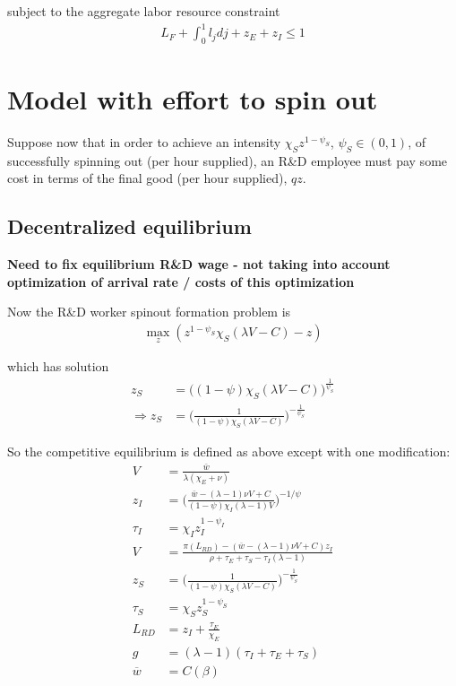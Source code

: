 \documentclass[12pt,english]{article}
\theoremstyle{remark}
\begin{document}
subject to the aggregate labor resource constraint
\begin{align*}
L_F + \int_0^1 l_j dj + z_E + z_I \le 1
\end{align*}

\section{Model with effort to spin out}

Suppose now that in order to achieve an intensity $\chi_S z^{1-\psi_S}$, $\psi_S \in (0,1)$, of successfully spinning out (per hour supplied), an R\&D employee must pay some cost in terms of the final good (per hour supplied), $qz$. 

\subsection{Decentralized equilibrium}

\textbf{Need to fix equilibrium R\&D wage - not taking into account optimization of arrival rate / costs of this optimization}

Now the R\&D worker spinout formation problem is 
\begin{align*}
	\max_{z} (z^{1-\psi_S} \chi_S (\lambda V - C) - z)
\end{align*} 

which has solution
\begin{align*}
	z_S &= \Big( (1-\psi) \chi_S (\lambda V - C)  \Big)^{\frac{1}{\psi_S}} \\
	\Rightarrow z_S &= \Big( \frac{1}{(1-\psi) \chi_S (\lambda V - C)}  \Big)^{-\frac{1}{\psi_S}}
\end{align*}

So the competitive equilibrium is defined as above except with one modification:
\begin{align*}
V &= \frac{\bar{w}}{\lambda(\chi_E + \nu)} \\
z_I &= \Big(  \frac{\bar{w}-(\lambda-1)\nu V + C}{(1-\psi)\chi_I(\lambda-1)V} \Big)^{-1/\psi} \\
\tau_I &= \chi_I z_I^{1-\psi_I} \\
V &= \frac{\pi(L_{RD}) - (\overline{w} - (\lambda-1)\nu V + C) z_I}{\rho + \tau_E + \tau_S - \tau_I (\lambda -1)} \\
z_S &= \Big( \frac{1}{(1-\psi) \chi_S (\lambda V - C)}  \Big)^{-\frac{1}{\psi_S}} \\
\tau_S &= \chi_S z_S^{1-\psi_S}\\
L_{RD} &= z_I + \frac{\tau_E}{\chi_E} \\
g &= (\lambda - 1)(\tau_I + \tau_E+ \tau_S)  \\
\overline{w} &= C(\beta)
\end{align*}
\end{document}

